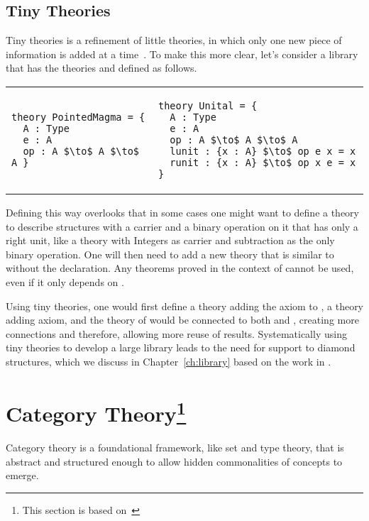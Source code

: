 \subsection{Tiny Theories}
\label{sec:background:tinytheories}
Tiny theories is a refinement of little theories, in which only one new piece of information is added at a time~\cite{mathscheme2011experiments}. To make this more clear, let's consider a library that has the theories  and  defined as follows. \\
\begin{tabular}{p{7cm} p{7cm}}
\begin{lstlisting}[mathescape, basicstyle=\footnotesize]
theory PointedMagma = { 
  A : Type 
  e : A 
  op : A $\to$ A $\to$ A }
\end{lstlisting}
&
\begin{lstlisting}[mathescape, basicstyle=\footnotesize]
theory Unital = {
  A : Type 
  e : A 
  op : A $\to$ A $\to$ A 
  lunit : {x : A} $\to$ op e x = x
  runit : {x : A} $\to$ op x e = x   }   
\end{lstlisting}
\end{tabular}
Defining  this way overlooks that in some cases one might want to define a theory to describe structures with a carrier and a binary operation on it that has only a right unit, like a theory with Integers as carrier and subtraction as the only binary operation. 
One will then need to add a new theory that is similar to  without the  declaration. Any theorems proved in the context of  cannot be used, even if it only depends on . 

Using tiny theories, one would first define a  theory adding the  axiom to , a  theory adding  axiom, and the theory of  would be connected to both  and , creating more connections and therefore, allowing more reuse of results. Systematically using tiny theories to develop a large library leads to the need for support to diamond structures, which we discuss in Chapter~\ref{ch:library} based on the work in \cite{carette2018building}.  

\section[Category Theory]{Category Theory\footnote{This section is based on~\cite{pierce1990taste}}}
\label{sec:categoryTh}
Category theory is a foundational framework, like set and type theory, that is abstract and structured enough to allow hidden commonalities of concepts to emerge. 


